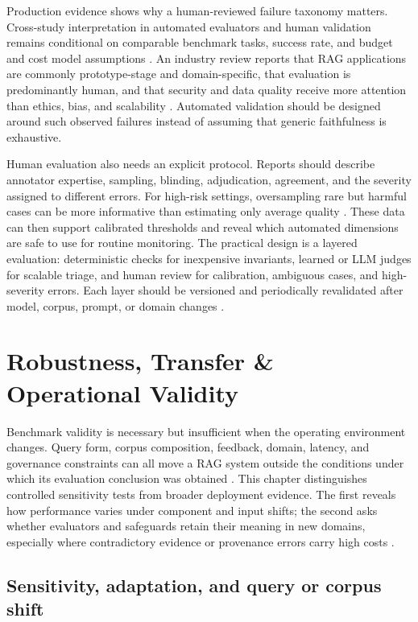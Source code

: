 \documentclass[a4paper,11pt]{article}
\begin{document}
Production evidence shows why a human-reviewed failure taxonomy matters. Cross-study interpretation in automated evaluators and human validation remains conditional on comparable benchmark tasks, success rate, and budget and cost model assumptions \citep{Caruzzo2026Deceptive}. An industry review reports that RAG applications are commonly prototype-stage and domain-specific, that evaluation is predominantly human, and that security and data quality receive more attention than ethics, bias, and scalability \citep{Brehme2025Retrieval}. Automated validation should be designed around such observed failures instead of assuming that generic faithfulness is exhaustive.

Human evaluation also needs an explicit protocol. Reports should describe annotator expertise, sampling, blinding, adjudication, agreement, and the severity assigned to different errors. For high-risk settings, oversampling rare but harmful cases can be more informative than estimating only average quality \citep{Caruzzo2026Deceptive,Brehme2025Retrieval}. These data can then support calibrated thresholds and reveal which automated dimensions are safe to use for routine monitoring. The practical design is a layered evaluation: deterministic checks for inexpensive invariants, learned or LLM judges for scalable triage, and human review for calibration, ambiguous cases, and high-severity errors. Each layer should be versioned and periodically revalidated after model, corpus, prompt, or domain changes \citep{SaadFalcon2023Ares,Murugaraj2025Ragvue,Ding2026Attribution}.
\section{Robustness, Transfer \& Operational Validity}


Benchmark validity is necessary but insufficient when the operating environment changes. Query form, corpus composition, feedback, domain, latency, and governance constraints can all move a RAG system outside the conditions under which its evaluation conclusion was obtained \citep{Muthyam2026Systems,Upadhyay2026Overview,Bang2026Feedback}. This chapter distinguishes controlled sensitivity tests from broader deployment evidence. The first reveals how performance varies under component and input shifts; the second asks whether evaluators and safeguards retain their meaning in new domains, especially where contradictory evidence or provenance errors carry high costs \citep{Zhang2026Before,Cahoon2025Optimizing,Javadi2025Contradictions}.
\subsection{Sensitivity, adaptation, and query or corpus shift}
\end{document}
